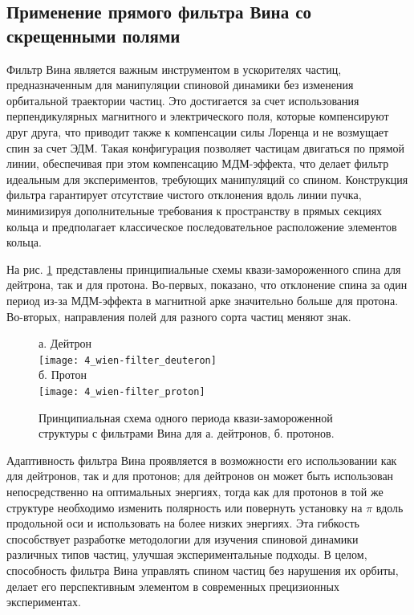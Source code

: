 	\subsection{Применение прямого фильтра Вина со скрещенными полями}

\par Фильтр Вина является важным инструментом в ускорителях частиц, предназначенным для манипуляции спиновой динамики без изменения орбитальной траектории частиц. Это достигается за счет использования перпендикулярных магнитного и электрического поля, которые компенсируют друг друга, что приводит также к компенсации силы Лоренца и не возмущает спин за счет ЭДМ. Такая конфигурация позволяет частицам двигаться по прямой линии, обеспечивая при этом компенсацию МДМ-эффекта, что делает фильтр идеальным для экспериментов, требующих манипуляций со спином. Конструкция фильтра гарантирует отсутствие чистого отклонения вдоль линии пучка, минимизируя дополнительные требования к пространству в прямых секциях кольца и предполагает классическое последовательное расположение элементов кольца.

\par На рис. \ref{fig:wien-filter} представлены принципиальные схемы квази-замороженного спина для дейтрона, так и для протона. Во-первых, показано, что отклонение спина за один период из-за МДМ-эффекта в магнитной арке значительно больше для протона. Во-вторых, направления полей для разного сорта частиц меняют знак.

\begin{figure} [h!]
	\centering
	а. Дейтрон\\
	\texttt{[image: 4\_wien-filter\_deuteron]}\\
	б. Протон\\
	\texttt{[image: 4\_wien-filter\_proton]}
	\caption{Принципиальная схема одного периода квази-замороженной структуры с фильтрами Вина для а. дейтронов, б. протонов.}
	\label{fig:wien-filter}
\end{figure}

\par Адаптивность фильтра Вина проявляется в возможности его использовании как для дейтронов, так и для протонов; для дейтронов он может быть использован непосредственно на оптимальных энергиях, тогда как для протонов в той же структуре необходимо изменить полярность или повернуть установку на $\pi$ вдоль продольной оси и использовать на более низких энергиях. Эта гибкость способствует разработке методологии для изучения спиновой динамики различных типов частиц, улучшая экспериментальные подходы. В целом, способность фильтра Вина управлять спином частиц без нарушения их орбиты, делает его перспективным элементом в современных прецизионных  экспериментах.

